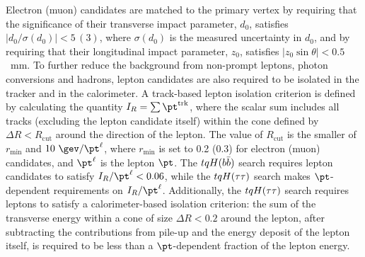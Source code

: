 Electron (muon) candidates are matched to the primary vertex by requiring that the significance of their transverse impact parameter, $d_0$, 
satisfies $|d_0/\sigma(d_0)|<5\,(3)$, where $\sigma(d_0)$ is the measured uncertainty in $d_0$,
and by requiring that their longitudinal impact parameter, $z_0$, satisfies $|z_0 \sin\theta|<0.5$~mm.
To further reduce the background from non-prompt leptons, photon conversions and hadrons, lepton candidates are also required to be isolated 
in the tracker and in the calorimeter.
A track-based lepton isolation criterion is defined by calculating the quantity $I_R = \sum \pt^{\textrm{trk}}$, where
the scalar sum includes all tracks (excluding the lepton candidate itself) within the cone defined by $\Delta R<R_{\textrm{cut}}$ around the %
direction of the lepton.  The value of $R_{\textrm{cut}}$ is the smaller of $r_{\textrm{min}}$ and $10~\gev/\pt^\ell$, where
$r_{\textrm{min}}$ is set to 0.2 (0.3) for electron (muon) candidates, and $\pt^\ell$ is the lepton $\pt$. 
The $tqH(b\bar{b})$ search requires lepton candidates to satisfy $I_R/\pt^\ell < 0.06$, while the $tqH(\tau\tau)$ search 
makes $\pt$-dependent requirements on $I_R/\pt^\ell$. Additionally, the $tqH(\tau\tau)$ search requires leptons to
satisfy a calorimeter-based isolation criterion: the sum of the transverse energy within a cone of size
$\Delta R<0.2$ around the lepton, after subtracting the contributions
from pile-up and the energy deposit of the lepton itself, is required to be less than a $\pt$-dependent 
fraction of the lepton energy. 

